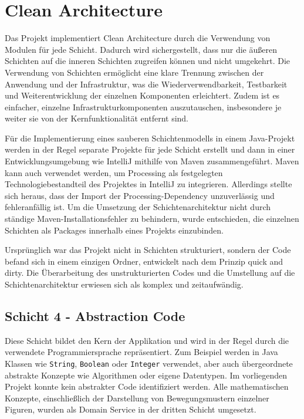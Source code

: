 \chapter{Clean Architecture}
\label{txt:ca}

Das Projekt implementiert Clean Architecture durch die Verwendung von Modulen für jede Schicht. 
Dadurch wird sichergestellt, dass nur die äußeren Schichten auf die inneren Schichten zugreifen können und nicht umgekehrt. 
Die Verwendung von Schichten ermöglicht eine klare Trennung zwischen der Anwendung und der Infrastruktur, was die Wiederverwendbarkeit, Testbarkeit und Weiterentwicklung der einzelnen Komponenten erleichtert. 
Zudem ist es einfacher, einzelne Infrastrukturkomponenten auszutauschen, insbesondere je weiter sie von der Kernfunktionalität entfernt sind.

Für die Implementierung eines sauberen Schichtenmodells in einem Java-Projekt werden in der Regel separate Projekte für jede Schicht erstellt und dann in einer Entwicklungsumgebung wie IntelliJ mithilfe von Maven zusammengeführt. 
Maven kann auch verwendet werden, um Processing als festgelegten Technologiebestandteil des Projektes in IntelliJ zu integrieren. 
Allerdings stellte sich heraus, dass der Import der Processing-Dependency unzuverlässig und fehleranfällig ist. 
Um die Umsetzung der Schichtenarchitektur nicht durch ständige Maven-Installationsfehler zu behindern, wurde entschieden, die einzelnen Schichten als Packages innerhalb eines Projekts einzubinden.

Ursprünglich war das Projekt nicht in Schichten strukturiert, sondern der Code befand sich in einem einzigen Ordner, entwickelt nach dem Prinzip \glqq quick and dirty\grqq. 
Die Überarbeitung des unstrukturierten Codes und die Umstellung auf die Schichtenarchitektur erwiesen sich als komplex und zeitaufwändig.

\newpage

\section{Schicht 4 - Abstraction Code}

Diese Schicht bildet den Kern der Applikation und wird in der Regel durch die verwendete Programmiersprache repräsentiert. 
Zum Beispiel werden in Java Klassen wie \texttt{String}, \texttt{Boolean} oder \texttt{Integer} verwendet, aber auch übergeordnete abstrakte Konzepte wie Algorithmen oder eigene Datentypen. 
Im vorliegenden Projekt konnte kein abstrakter Code identifiziert werden.
Alle mathematischen Konzepte, einschließlich der Darstellung von Bewegungsmustern einzelner Figuren, wurden als Domain Service in der dritten Schicht umgesetzt.

